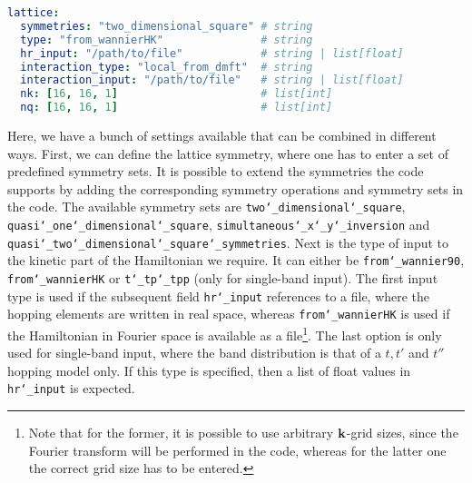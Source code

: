 \documentclass[../../main.tex]{subfiles}
\begin{document}
\begin{minipage}{\textwidth}%
\begin{lstlisting}[language=yaml]
lattice:
  symmetries: "two_dimensional_square" # string
  type: "from_wannierHK"               # string
  hr_input: "/path/to/file"            # string | list[float]
  interaction_type: "local_from_dmft"  # string
  interaction_input: "/path/to/file"   # string | list[float]
  nk: [16, 16, 1]                      # list[int]
  nq: [16, 16, 1]                      # list[int]
\end{lstlisting}
\end{minipage}
Here, we have a bunch of settings available that can be combined in different ways. First, we can define the lattice symmetry, where one has to enter a set of predefined symmetry sets. It is possible to extend the symmetries the code supports by adding the corresponding symmetry operations and symmetry sets in the code. The available symmetry sets are \texttt{two\char`_dimensional\char`_square}, \texttt{quasi\char`_one\char`_dimensional\char`_square}, \texttt{simultaneous\char`_x\char`_y\char`_inversion} and \texttt{quasi\char`_two\char`_dimensional\char`_square\char`_symmetries}. Next is the type of input to the kinetic part of the Hamiltonian we require. It can either be \texttt{from\char`_wannier90}, \texttt{from\char`_wannierHK} or \texttt{t\char`_tp\char`_tpp} (only for single-band input). The first input type is used if the subsequent field \texttt{hr\char`_input} references to a file, where the hopping elements are written in real space, whereas \texttt{from\char`_wannierHK} is used if the Hamiltonian in Fourier space is available as a file\footnote{Note that for the former, it is possible to use arbitrary $\textbf{k}$-grid sizes, since the Fourier transform will be performed in the code, whereas for the latter one the correct grid size has to be entered.}. The last option is only used for single-band input, where the band distribution is that of a $t, t'$ and $t''$ hopping model only. If this type is specified, then a list of float values in \texttt{hr\char`_input} is expected.
\end{document}
